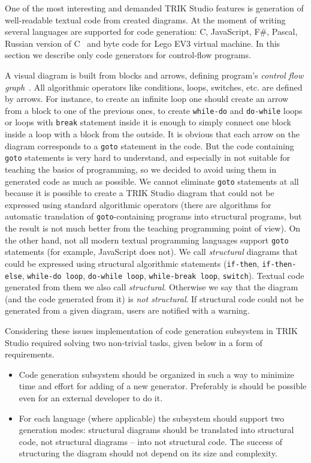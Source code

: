 \documentclass[conference]{IEEEtran}
\begin{document}
{One of the most interesting and demanded TRIK Studio features is generation of well-readable textual code from created diagrams. At the moment of writing several languages are supported for code generation: C, JavaScript, F\#, Pascal, Russian version of C~\cite{тереховотечественные} and byte code for Lego EV3 virtual machine. In this section we describe only code generators for control-flow programs.

A visual diagram is built from blocks and arrows, defining program's \textit{control flow graph}~\cite{steven1997advanced}. All algorithmic operators like conditions, loops, switches, etc. are defined by arrows. For instance, to create an infinite loop one should create an arrow from a block to one of the previous ones, to create \texttt{while-do} and \texttt{do-while} loops or loops with \texttt{break} statement inside it is enough to simply connect one block inside a loop with a block from the outside. It is obvious that each arrow on the diagram corresponds to a \texttt{goto} statement in the code. But the code containing \texttt{goto} statements is very hard to understand, and especially in not suitable for teaching the basics of programming, so we decided to avoid using them in generated code as much as possible. We cannot eliminate \texttt{goto} statements at all because it is possible to create a TRIK Studio diagram that could not be expressed using standard algorithmic operators (there are algorithms for automatic translation of \texttt{goto}-containing programs into structural programs, but the result is not much better from the teaching programming point of view). On the other hand, not all modern textual programming languages support \texttt{goto} statements (for example, JavaScript does not). We call \textit{structural} diagrams that could be expressed using structural algorithmic statements (\texttt{if-then}, \texttt{if-then-else}, \texttt{while-do loop}, \texttt{do-while loop}, \texttt{while-break loop}, \texttt{switch}). Textual code generated from them we also call \textit{structural}. Otherwise we say that the diagram (and the code generated from it) is \textit{not structural}. If structural code could not be generated from a given diagram, users are notified with a warning.

Considering these issues implementation of code generation subsystem in TRIK Studio required solving two non-trivial tasks, given below in a form of requirements.
 
\begin{itemize}
    \item Code generation subsystem should be organized in such a way to minimize time and effort for adding of a new generator. Preferably is should be possible even for an external developer to do it.
    \item For each language (where applicable) the subsystem should support two generation modes: structural diagrams should be translated into structural code, not structural diagrams -- into not structural code. The success of structuring the diagram should not depend on its size and complexity.
\end{itemize}

}
\end{document}
